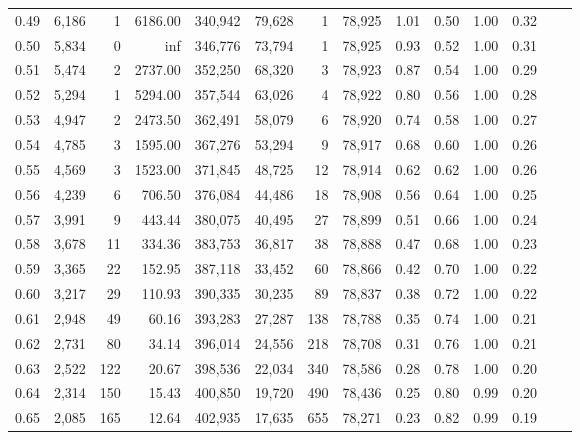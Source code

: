 \begin{tabular}{rrrrrrrrrrrrrr}
0.49 &  6,186 &      1 &  6186.00 &  340,942 &   79,628 &       1 &  78,925 &  1.01 &  0.50 &  1.00 &      0.32 \\
0.50 &  5,834 &      0 &      inf &  346,776 &   73,794 &       1 &  78,925 &  0.93 &  0.52 &  1.00 &      0.31 \\
0.51 &  5,474 &      2 &  2737.00 &  352,250 &   68,320 &       3 &  78,923 &  0.87 &  0.54 &  1.00 &      0.29 \\
0.52 &  5,294 &      1 &  5294.00 &  357,544 &   63,026 &       4 &  78,922 &  0.80 &  0.56 &  1.00 &      0.28 \\
0.53 &  4,947 &      2 &  2473.50 &  362,491 &   58,079 &       6 &  78,920 &  0.74 &  0.58 &  1.00 &      0.27 \\
0.54 &  4,785 &      3 &  1595.00 &  367,276 &   53,294 &       9 &  78,917 &  0.68 &  0.60 &  1.00 &      0.26 \\
0.55 &  4,569 &      3 &  1523.00 &  371,845 &   48,725 &      12 &  78,914 &  0.62 &  0.62 &  1.00 &      0.26 \\
0.56 &  4,239 &      6 &   706.50 &  376,084 &   44,486 &      18 &  78,908 &  0.56 &  0.64 &  1.00 &      0.25 \\
0.57 &  3,991 &      9 &   443.44 &  380,075 &   40,495 &      27 &  78,899 &  0.51 &  0.66 &  1.00 &      0.24 \\
0.58 &  3,678 &     11 &   334.36 &  383,753 &   36,817 &      38 &  78,888 &  0.47 &  0.68 &  1.00 &      0.23 \\
0.59 &  3,365 &     22 &   152.95 &  387,118 &   33,452 &      60 &  78,866 &  0.42 &  0.70 &  1.00 &      0.22 \\
0.60 &  3,217 &     29 &   110.93 &  390,335 &   30,235 &      89 &  78,837 &  0.38 &  0.72 &  1.00 &      0.22 \\
0.61 &  2,948 &     49 &    60.16 &  393,283 &   27,287 &     138 &  78,788 &  0.35 &  0.74 &  1.00 &      0.21 \\
0.62 &  2,731 &     80 &    34.14 &  396,014 &   24,556 &     218 &  78,708 &  0.31 &  0.76 &  1.00 &      0.21 \\
0.63 &  2,522 &    122 &    20.67 &  398,536 &   22,034 &     340 &  78,586 &  0.28 &  0.78 &  1.00 &      0.20 \\
0.64 &  2,314 &    150 &    15.43 &  400,850 &   19,720 &     490 &  78,436 &  0.25 &  0.80 &  0.99 &      0.20 \\
0.65 &  2,085 &    165 &    12.64 &  402,935 &   17,635 &     655 &  78,271 &  0.23 &  0.82 &  0.99 &      0.19 \\

\end{tabular}
